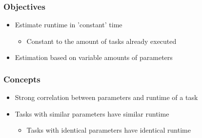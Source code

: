 

\begin{frame}
	\frametitle{Objectives}
		\begin{itemize}
			\item<2-> {Estimate runtime in 'constant' time}
				\begin{itemize}
					\item<3-> {Constant to the amount of tasks already executed}	
				\end{itemize}
				\item<4-> {Estimation based on variable amounts of parameters}
			\end{itemize}
\end{frame}		
		
\begin{frame} 
	\frametitle{Concepts}
		\begin{itemize}
			\item<2-> {Strong correlation between parameters and runtime of a task}
			\item<3-> {Tasks with similar parameters have similar runtime}
				\begin{itemize}
					\item<4-> {Tasks with identical parameters have identical runtime}	
				\end{itemize}	
		\end{itemize}
\end{frame}


